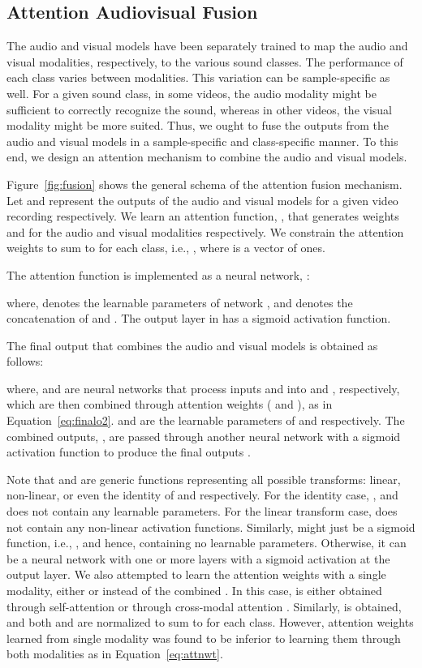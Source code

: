 \documentclass{article}
\begin{document}
\subsection{Attention Audiovisual Fusion}\label{sec:afusion}

The audio and visual models have been separately trained to map the audio and visual modalities, respectively, to the various sound classes.
The performance of each class varies between modalities.
This variation can be sample-specific as well.
For a given sound class, in some videos, the audio modality might be sufficient to correctly recognize the sound, whereas in other videos, the visual modality might be more suited.
Thus, we ought to fuse the outputs from the audio and visual models in a sample-specific and class-specific manner.
To this end, we design an attention mechanism to combine the audio and visual models.

Figure~\ref{fig:fusion} shows the general schema of the attention fusion mechanism.
Let  and  represent the outputs of the audio and visual models for a given video recording respectively.
We learn an attention function, , that generates weights  and  for the audio and visual modalities respectively.
We constrain the attention weights to sum to  for each class, i.e., , where  is a vector of ones.

The attention function is implemented as a neural network, :

where,  denotes the learnable parameters of network , and
 denotes the concatenation of  and .
The output layer in  has a sigmoid activation function.

The final output that combines the audio and visual models is obtained as follows:

where,  and  are neural networks that process inputs  and  into  and , respectively, which are then combined through attention weights ( and  ), as in Equation~\ref{eq:finalo2}.
 and  are the learnable parameters of  and  respectively.
The combined outputs, , are passed through another neural network  with a sigmoid activation function to produce the final outputs .

Note that  and  are generic functions representing all possible transforms: linear, non-linear, or even the identity of  and  respectively.
For the identity case, , and  does not contain any learnable parameters.
For the linear transform case,  does not contain any non-linear activation functions.
Similarly,  might just be a sigmoid function, i.e., , and hence, containing no learnable parameters.
Otherwise, it can be a neural network with one or more layers with a sigmoid activation at the output layer.
We also attempted to learn the attention weights with a single modality, either  or  instead of the combined .
In this case,  is either obtained through self-attention  or through cross-modal attention .
Similarly,  is obtained, and both  and  are normalized to sum to  for each class.
However, attention weights learned from single modality was found to be inferior to learning them through both modalities as in Equation~\ref{eq:attnwt}.
\end{document}
